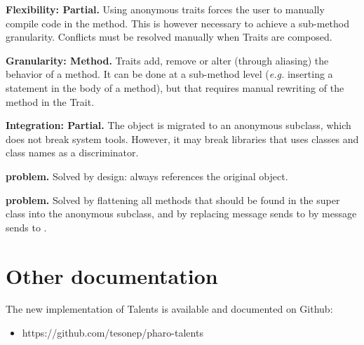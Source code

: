 \documentclass[10pt,twoside,english]{_support/latex/sbabook/sbabook}
\begin{document}
\textbf{Flexibility: Partial.} Using anonymous traits forces the user to manually compile code in the method. This is however necessary to achieve a sub-method granularity. Conflicts must be resolved manually when Traits are composed.

\textbf{Granularity: Method.} Traits add, remove or alter (through aliasing) the behavior of a method. It can be done at a sub-method level (\textit{e.g.} inserting a statement in the body of a method), but that requires manual rewriting of the method in the Trait.

\textbf{Integration: Partial.} The object is migrated to an anonymous subclass, which does not break system tools. However, it may break libraries that uses classes and class names as a discriminator.

\textbf{ problem.} Solved by design:  always references the original object.

\textbf{ problem.} Solved by flattening all methods that should be found in the super class into the anonymous subclass, and by replacing message sends to  by message sends to .
\section{Other documentation}
The new implementation of Talents is available and documented on Github:

\begin{itemize}
\item https://github.com/tesonep/pharo-talents
\end{itemize}






\backmatter

\end{document}
